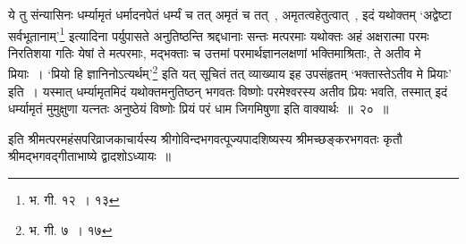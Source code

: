 ये तु संन्यासिनः धर्म्यामृतं धर्मादनपेतं धर्म्यं च तत् अमृतं च तत्~, अमृतत्वहेतुत्वात्~, इदं यथोक्तम् ‘अद्वेष्टा सर्वभूतानाम्’\footnote{भ. गी. १२~। १३} इत्यादिना पर्युपासते अनुतिष्ठन्ति श्रद्दधानाः सन्तः मत्परमाः यथोक्तः अहं अक्षरात्मा परमः निरतिशया गतिः येषां ते मत्परमाः, मद्भक्ताः च उत्तमां परमार्थज्ञानलक्षणां भक्तिमाश्रिताः, ते अतीव मे प्रियाः~। ‘प्रियो हि ज्ञानिनोऽत्यर्थम्’\footnote{भ. गी. ७~। १७} इति यत् सूचितं तत् व्याख्याय इह उपसंहृतम् ‘भक्तास्तेऽतीव मे प्रियाः’ इति~। यस्मात् धर्म्यामृतमिदं यथोक्तमनुतिष्ठन् भगवतः विष्णोः परमेश्वरस्य अतीव प्रियः भवति, तस्मात् इदं धर्म्यामृतं मुमुक्षुणा यत्नतः अनुष्ठेयं विष्णोः प्रियं परं धाम जिगमिषुणा इति वाक्यार्थः~॥~२०~॥\par
 
इति श्रीमत्परमहंसपरिव्राजकाचार्यस्य श्रीगोविन्दभगवत्पूज्यपादशिष्यस्य श्रीमच्छङ्करभगवतः कृतौ श्रीमद्भगवद्गीताभाष्ये द्वादशोऽध्यायः~॥\par
 
